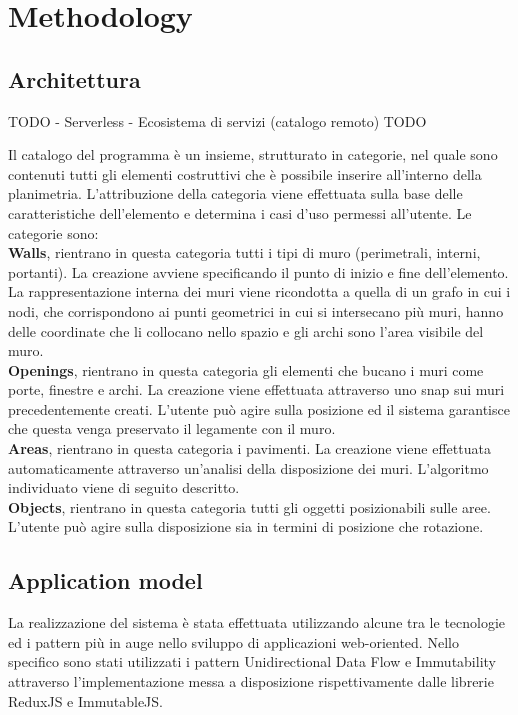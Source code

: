 \section{Methodology}

\subsection{Architettura}

TODO
- Serverless
- Ecosistema di servizi (catalogo remoto)
TODO



Il catalogo del programma è un insieme, strutturato in categorie, nel quale sono contenuti tutti gli elementi costruttivi che è possibile inserire all’interno della planimetria. L’attribuzione della categoria viene effettuata sulla base delle caratteristiche dell’elemento e determina i casi d’uso permessi all’utente.
Le categorie sono:\\
\textbf{Walls}, rientrano in questa categoria tutti i tipi di muro (perimetrali, interni, portanti). La creazione avviene specificando il punto di inizio e fine dell’elemento. La rappresentazione interna dei muri viene ricondotta a quella di un grafo in cui i nodi, che corrispondono ai punti geometrici in cui si intersecano più muri, hanno delle coordinate che li collocano nello spazio e gli archi sono l’area visibile del muro.\\
\textbf{Openings}, rientrano in questa categoria gli elementi che bucano i muri come porte, finestre e archi. La creazione viene effettuata attraverso uno snap sui muri precedentemente creati. L’utente può agire sulla posizione ed il sistema garantisce che questa venga preservato il legamente con il muro. \\
\textbf{Areas}, rientrano in questa categoria i pavimenti. La creazione viene effettuata automaticamente attraverso un’analisi della disposizione dei muri. L’algoritmo individuato viene di seguito descritto.\\
\textbf{Objects}, rientrano in questa categoria tutti gli oggetti posizionabili sulle aree. L’utente può agire sulla disposizione sia in termini di posizione che rotazione.\\

\subsection{Application model}
La realizzazione del sistema è stata effettuata utilizzando alcune tra le tecnologie ed i pattern più in auge nello sviluppo di applicazioni web-oriented. Nello specifico sono stati utilizzati i pattern Unidirectional Data Flow e Immutability attraverso l’implementazione messa a disposizione rispettivamente dalle librerie ReduxJS e ImmutableJS.


